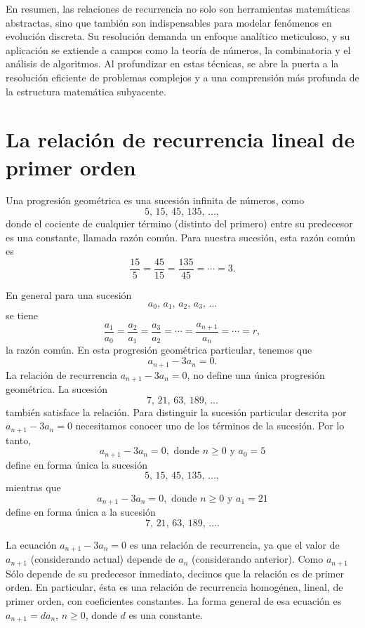En resumen, las relaciones de recurrencia no solo son herramientas matemáticas abstractas, sino que también son indispensables para modelar fenómenos en evolución discreta. Su resolución demanda un enfoque analítico meticuloso, y su aplicación se extiende a campos como la teoría de números, la combinatoria y el análisis de algoritmos. Al profundizar en estas técnicas, se abre la puerta a la resolución eficiente de problemas complejos y a una comprensión más profunda de la estructura matemática subyacente.

\section{La relación de recurrencia lineal de primer orden}

Una progresión geométrica es una sucesión infinita de números, como
$$5, \, 15, \, 45, \, 135, \, \dots ,$$
donde el cociente de cualquier término (distinto del primero) entre su predecesor es una constante, llamada razón común. Para nuestra sucesión, esta razón común es
$$\frac{15}{5} = \frac{45}{15} = \frac{135}{45} = \cdots = 3.$$

En general para una sucesión
$$a_0, \, a_1, \, a_2, \, a_3, \, \dots$$
se tiene
$$\frac{a_1}{a_0} = \frac{a_2}{a_1} = \frac{a_3}{a_2} = \cdots = \frac{a_{n+1}}{a_n} = \cdots = r,$$
la razón común. En esta progresión geométrica particular, tenemos que
$$a_{n+1} - 3a_n = 0.$$
La relación de recurrencia $a_{n+1} - 3a_n = 0$, no define una única progresión geométrica. La sucesión
$$7, \, 21, \, 63, \, 189, \, \dots$$
también satisface la relación. Para distinguir la sucesión particular descrita por $a_{n+1} - 3a_n = 0$ necesitamos conocer uno de los términos de la sucesión. Por lo tanto,
$$a_{n+1} - 3a_n = 0, \text{ donde } n \geq 0 \text{ y } a_0 = 5$$
define en forma única la sucesión
$$5, \, 15, \, 45, \, 135, \, \dots ,$$
mientras que
$$a_{n+1} - 3a_n = 0, \text{ donde } n \geq 0 \text{ y } a_1 = 21$$
define en forma única a la sucesión
$$7, \, 21, \, 63, \, 189, \, \dots.$$

La ecuación $a_{n+1} - 3a_n = 0$ es una relación de recurrencia, ya que el valor de $a_{n+1}$ (considerando actual) depende de $a_n$ (considerando anterior). Como $a_{n+1}$ Sólo depende de su predecesor inmediato, decimos que la relación es de primer orden. En particular, ésta es una relación de recurrencia homogénea, lineal, de primer orden, con coeficientes constantes. La forma general de esa ecuación es $a_{n+1} = da_n$, $n \geq 0$, donde $d$ es una constante.

